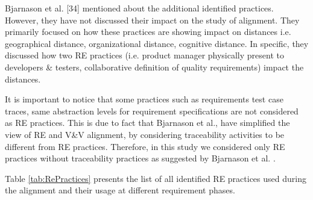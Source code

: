 \documentclass{article}
\begin{document}
 Bjarnason et al. [34] mentioned about the additional identified practices. However, they have not discussed their impact on the study of alignment. They primarily focused on how these practices are showing impact on distances i.e. geographical distance, organizational distance, cognitive distance. In specific, they discussed how two RE practices (i.e. product manager physically present to developers \& testers, collaborative definition of quality requirements) impact the distances.

It is important to notice that some practices such as requirements test case traces, same abstraction levels for requirement specifications are not considered as RE practices. This is due to fact that Bjarnason et al.\cite{bjarnason2014challengesS9}, have simplified the view of RE and V\&V alignment, by considering traceability activities to be different from RE practices. Therefore, in this study we considered only RE practices without traceability practices as suggested by Bjarnason et al. \cite{bjarnason2014challengesS9}. 



Table  \ref{tab:RePractices} presents the list of all identified RE practices used during the alignment and their usage at different requirement phases.
\end{document}
